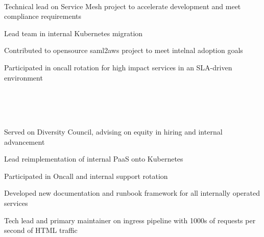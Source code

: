 \documentclass[letterpaper,11pt,notitlepage]{article}
\begin{document}

\vbar
{}
         \\
        \begin{employment}
          \item Technical lead on Service Mesh project to accelerate development
            and meet compliance requirements
          \item Lead team in internal Kubernetes migration
          \item Contributed to opensource saml2aws project to meet intelnal adoption goals
          \item Participated in oncall rotation for high impact services in an
            SLA-driven environment
        \end{employment}
         \\
         \\
         \\
        \begin{employment}
          \item Served on Diversity Council, advising on equity in hiring and internal advancement
          \item Lead reimplementation of internal PaaS onto Kubernetes
          \item Participated in Oncall and internal support rotation
          \item Developed new documentation and runbook framework for all internally operated services
          \item Tech lead and primary maintainer on ingress pipeline with 1000s of requests per second of HTML traffic
       \end{employment}
         \\
         \\
         \\
\end{document}
